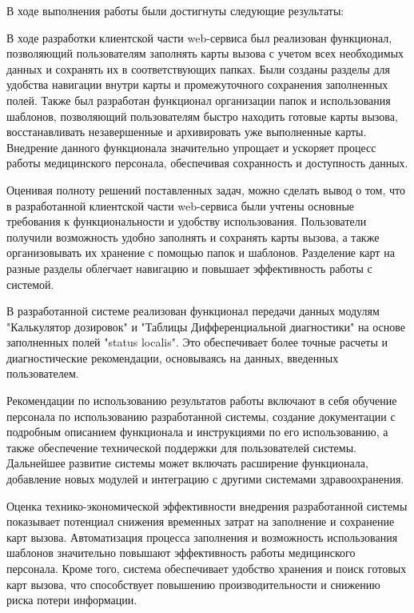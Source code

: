 \conclusion

В ходе выполнения работы были достигнуты следующие результаты:

В ходе разработки клиентской части web-сервиса был реализован функционал, позволяющий пользователям заполнять карты вызова с учетом всех необходимых данных и сохранять их в соответствующих папках. Были созданы разделы для удобства навигации внутри карты и промежуточного сохранения заполненных полей. Также был разработан функционал организации папок и использования шаблонов, позволяющий пользователям быстро находить готовые карты вызова, восстанавливать незавершенные и архивировать уже выполненные карты. Внедрение данного функционала значительно упрощает и ускоряет процесс работы медицинского персонала, обеспечивая сохранность и доступность данных.

Оценивая полноту решений поставленных задач, можно сделать вывод о том, что в разработанной клиентской части web-сервиса были учтены основные требования к функциональности и удобству использования. Пользователи получили возможность удобно заполнять и сохранять карты вызова, а также организовывать их хранение с помощью папок и шаблонов. Разделение карт на разные разделы облегчает навигацию и повышает эффективность работы с системой.

В разработанной системе реализован функционал передачи данных модулям "Калькулятор дозировок" и "Таблицы Дифференциальной диагностики" на основе заполненных полей "status localis". Это обеспечивает более точные расчеты и диагностические рекомендации, основываясь на данных, введенных пользователем.

Рекомендации по использованию результатов работы включают в себя обучение персонала по использованию разработанной системы, создание документации с подробным описанием функционала и инструкциями по его использованию, а также обеспечение технической поддержки для пользователей системы. Дальнейшее развитие системы может включать расширение функционала, добавление новых модулей и интеграцию с другими системами здравоохранения.

Оценка технико-экономической эффективности внедрения разработанной системы показывает потенциал снижения временных затрат на заполнение и сохранение карт вызова. Автоматизация процесса заполнения и возможность использования шаблонов значительно повышают эффективность работы медицинского персонала. Кроме того, система обеспечивает удобство хранения и поиск готовых карт вызова, что способствует повышению производительности и снижению риска потери информации.

